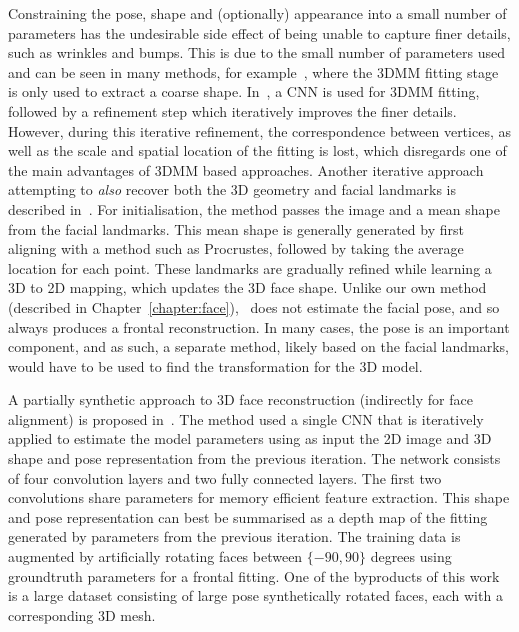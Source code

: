 Constraining the pose, shape and (optionally) appearance into a small
number of parameters has the undesirable side effect of being unable
to capture finer details, such as wrinkles and bumps. This is due to
the small number of parameters used and can be seen in many methods,
for example~\cite{richardson2016learning}, where the 3DMM fitting
stage is only used to extract a coarse
shape. In~\cite{sela2017unrestricted}, a CNN is used for 3DMM fitting,
followed by a refinement step which iteratively improves the finer
details. However, during this iterative refinement, the correspondence
between vertices, as well as the scale and spatial location of the
fitting is lost, which disregards one of the main advantages of 3DMM
based approaches. Another iterative approach attempting to
\textit{also} recover both the 3D geometry and facial landmarks is
described in~\cite{liu2016joint}. For initialisation, the method
passes the image and a mean shape from the facial landmarks. This mean
shape is generally generated by first aligning with a method such as
Procrustes, followed by taking the average location for each
point. These landmarks are gradually refined while learning a 3D to 2D
mapping, which updates the 3D face shape. Unlike our own method
(described in Chapter~\ref{chapter:face}),~\cite{liu2016joint} does
not estimate the facial pose, and so always produces a frontal
reconstruction. In many cases, the pose is an important component, and
as such, a separate method, likely based on the facial landmarks,
would have to be used to find the transformation for the 3D model.

A partially synthetic approach to 3D face reconstruction (indirectly
for face alignment) is proposed in~\cite{zhu2016face}. The method used
a single CNN that is iteratively applied to estimate the model
parameters using as input the 2D image and 3D shape and pose
representation from the previous iteration. The network consists of
four convolution layers and two fully connected layers. The first two
convolutions share parameters for memory efficient feature
extraction. This shape and pose representation can best be summarised
as a depth map of the fitting generated by parameters from the
previous iteration. The training data is augmented by artificially
rotating faces between $\{-90, 90\}$ degrees using groundtruth
parameters for a frontal fitting. One of the byproducts of this work
is a large dataset consisting of large pose synthetically rotated
faces, each with a corresponding 3D mesh.

